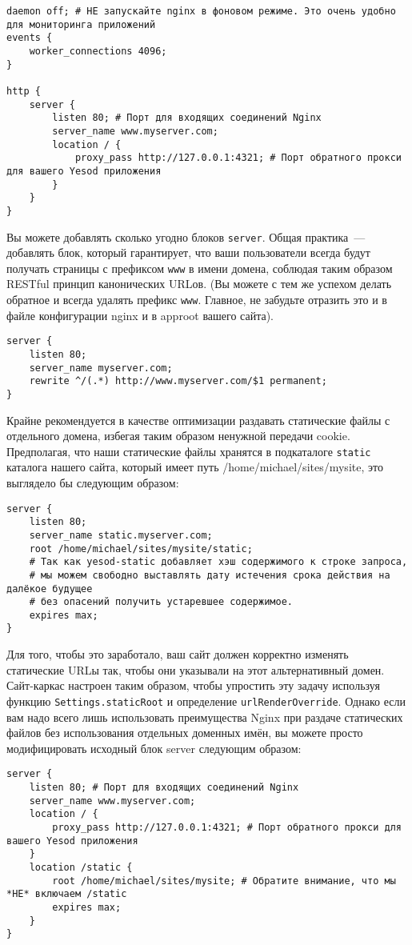 \begin{lstlisting}
daemon off; # НЕ запускайте nginx в фоновом режиме. Это очень удобно для мониторинга приложений
events {
    worker_connections 4096;
}

http {
    server {
        listen 80; # Порт для входящих соединений Nginx
        server_name www.myserver.com;
        location / {
            proxy_pass http://127.0.0.1:4321; # Порт обратного прокси для вашего Yesod приложения
        }
    }
}
\end{lstlisting}
Вы можете добавлять сколько угодно блоков \lstinline{server}. Общая
практика~--- добавлять блок, который гарантирует, что ваши пользователи всегда
будут получать страницы с префиксом \lstinline{www} в имени домена, соблюдая
таким образом RESTful принцип канонических URLов. (Вы можете с тем же успехом
делать обратное и всегда удалять префикс \lstinline{www}. Главное, не забудьте
отразить это и в файле конфигурации nginx и в approot вашего сайта).

\begin{lstlisting}
server {
    listen 80;
    server_name myserver.com;
    rewrite ^/(.*) http://www.myserver.com/$1 permanent;
}
\end{lstlisting}%

Крайне рекомендуется в качестве оптимизации раздавать статические файлы с
отдельного домена, избегая таким образом ненужной передачи cookie. Предполагая,
что наши статические файлы хранятся в подкаталоге \lstinline{static} каталога
нашего сайта, который имеет путь /home/michael/sites/mysite, это выглядело бы
следующим образом:

\begin{lstlisting}
server {
    listen 80;
    server_name static.myserver.com;
    root /home/michael/sites/mysite/static;
    # Так как yesod-static добавляет хэш содержимого к строке запроса,
    # мы можем свободно выставлять дату истечения срока действия на далёкое будущее
    # без опасений получить устаревшее содержимое.
    expires max;
}
\end{lstlisting}

Для того, чтобы это заработало, ваш сайт должен корректно изменять статические
URLы так, чтобы они указывали на этот альтернативный домен. Сайт-каркас
настроен таким образом, чтобы упростить эту задачу используя функцию
\lstinline{Settings.staticRoot} и определение \lstinline{urlRenderOverride}.
Однако если вам надо всего лишь использовать преимущества Nginx при раздаче
статических файлов без использования отдельных доменных имён, вы можете просто
модифицировать исходный блок server следующим образом:
\begin{lstlisting}
server {
    listen 80; # Порт для входящих соединений Nginx
    server_name www.myserver.com;
    location / {
        proxy_pass http://127.0.0.1:4321; # Порт обратного прокси для вашего Yesod приложения
    }
    location /static {
        root /home/michael/sites/mysite; # Обратите внимание, что мы *НЕ* включаем /static
        expires max;
    }
}
\end{lstlisting}
%

